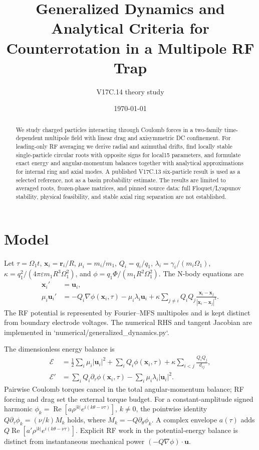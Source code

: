 \documentclass[11pt,a4paper]{article}
\title{Generalized Dynamics and Analytical Criteria for Counterrotation in a Multipole RF Trap}
\author{V17C.14 theory study}
\date{\today}
\begin{document}
\maketitle

\begin{abstract}
We study charged particles interacting through Coulomb forces in a two-family time-dependent multipole field with linear drag and axisymmetric DC confinement. For leading-only RF averaging we derive radial and azimuthal drifts, find locally stable single-particle circular roots with opposite signs for local15 parameters, and formulate exact energy and angular-momentum balances together with analytical approximations for internal ring and axial modes. A published V17C.13 six-particle result is used as a selected reference, not as a basin probability estimate. The results are limited to averaged roots, frozen-phase matrices, and pinned source data: full Floquet/Lyapunov stability, physical feasibility, and stable axial ring separation are not established.
\end{abstract}

\section{Model}
Let \(\tau=\Omega_1t\), \(\bm x_i=\bm r_i/R\), \(\mu_i=m_i/m_1\), \(Q_i=q_i/q_1\), \(\lambda_i=\gamma_i/(m_i\Omega_1)\), \(\kappa=q_1^2/(4\pi\varepsilon m_1R^3\Omega_1^2)\), and \(\phi=q_1\Phi/(m_1R^2\Omega_1^2)\). The N-body equations are
\begin{align}
\bm x_i'&=\bm u_i,\\
\mu_i\bm u_i'&=-Q_i\nabla\phi(\bm x_i,\tau)-\mu_i\lambda_i\bm u_i+
\kappa\sum_{j\ne i}Q_iQ_j\frac{\bm x_i-\bm x_j}{|\bm x_i-\bm x_j|^3}.
\end{align}
The RF potential is represented by Fourier--MFS multipoles and is kept distinct from boundary electrode voltages. The numerical RHS and tangent Jacobian are implemented in `numerical/generalized_dynamics.py`.

The dimensionless energy balance is
\begin{align}
\mathcal E&=\frac12\sum_i\mu_i|\bm u_i|^2+\sum_iQ_i\phi(\bm x_i,\tau)+\kappa\sum_{i<j}\frac{Q_iQ_j}{d_{ij}},\\
\mathcal E'&=\sum_iQ_i\partial_\tau\phi(\bm x_i,\tau)-\sum_i\mu_i\lambda_i|\bm u_i|^2.
\end{align}
Pairwise Coulomb torques cancel in the total angular-momentum balance; RF forcing and drag set the external torque budget.
For a constant-amplitude signed harmonic \(\phi_k=\operatorname{Re}[a\rho^{|k|}e^{i(k\theta-\nu\tau)}]\), \(k\ne0\), the pointwise identity \(Q\partial_\tau\phi_k=(\nu/k)M_k\) holds, where \(M_k=-Q\partial_\theta\phi_k\). A complex envelope \(a(\tau)\) adds \(Q\operatorname{Re}[a'\rho^{|k|}e^{i(k\theta-\nu\tau)}]\). Explicit RF work in the potential-energy balance is distinct from instantaneous mechanical power \((-Q\nabla\phi)\cdot\bm u\).
\end{document}
